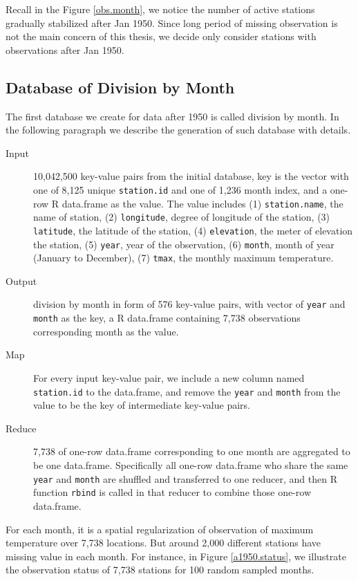 Recall in the Figure \href{../plots/obs_month.pdf}{\ref*{obs.month}}, we notice
the number of active stations gradually stabilized after Jan 1950. Since long
period of missing observation is not the main concern of this thesis, we decide
only consider stations with observations after Jan 1950.

\subsection{Database of Division by Month}

The first database we create for data after 1950 is called division by month. In
the following paragraph we describe the generation of such database with details.

\begin{description}
  \item[Input] 10,042,500 key-value pairs from the initial database, key is the
  vector with one of 8,125 unique \texttt{station.id} and one of 1,236 month 
  index, and a one-row R data.frame as the value. The value includes 
  (1) \texttt{station.name}, the name of station, (2) \texttt{longitude}, degree 
  of longitude of the station, (3) \texttt{latitude}, the latitude of the station, 
  (4) \texttt{elevation}, the meter of elevation the station, (5) \texttt{year}, 
  year of the observation, (6) \texttt{month}, month of year (January to 
  December), (7) \texttt{tmax}, the monthly maximum temperature.
  \item[Output] division by month in form of 576 key-value pairs, with vector of
  \texttt{year} and \texttt{month} as the key, a R data.frame containing 7,738 
  observations corresponding month as the value.
  \item[Map]For every input key-value pair, we include a new column named 
  \texttt{station.id} to the data.frame, and remove the \texttt{year} and 
  \texttt{month} from the value to be the key of intermediate key-value pairs. 
  \item[Reduce] 7,738 of one-row data.frame corresponding to one month are 
  aggregated to be one data.frame. Specifically all one-row data.frame who share
  the same \texttt{year} and \texttt{month} are shuffled and transferred to one 
  reducer, and then R function \texttt{rbind} is called in that reducer to combine 
  those one-row data.frame.
\end{description}


For each month, it is a spatial regularization of observation of maximum temperature 
over 7,738 locations. But around 2,000 different stations have missing value in 
each month. For instance, in Figure 
\href{../plots/tmax.a1950.status.pdf}{\ref*{a1950.status}},
we illustrate the observation status of 7,738 stations for 100 random sampled 
months.

